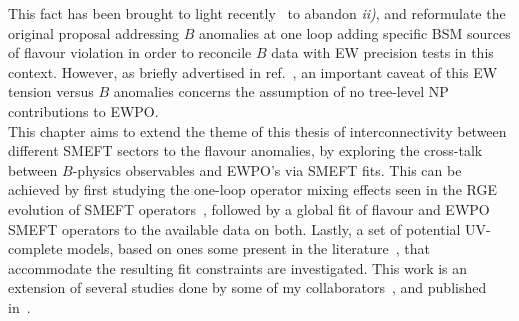 This fact has been brought to light recently~\cite{Coy:2019rfr} to abandon \textit{ii)}, and reformulate the original proposal addressing $B$ anomalies at one loop adding specific {BSM sources of flavour violation in order to reconcile $B$ data with EW precision tests in this context.} However, as briefly advertised in ref.~\cite{Ciuchini:2019usw}, an important caveat of this EW tension versus $B$ anomalies concerns the assumption of no tree-level NP contributions to EWPO. \\
This chapter aims to extend the theme of this thesis of interconnectivity between different SMEFT sectors to the flavour anomalies, by exploring the cross-talk between $B$-physics observables and EWPO's via SMEFT fits. This can be achieved by first studying the one-loop operator mixing effects seen in the RGE evolution of SMEFT operators~\cite{Jenkins:2013zja,Jenkins:2013wua}, followed by a global fit of flavour and EWPO SMEFT operators to the available data on both. Lastly, a set of potential UV-complete models, based on ones some present in the literature~\cite{Kamenik:2017tnu,Fox:2018ldq,Celis:2017doq},  that accommodate the resulting fit constraints are investigated. This work is an extension of several studies done by some of my collaborators~\cite{Ciuchini:2015qxb,Ciuchini:2016weo,Ciuchini:2017mik,Ciuchini:2017gva,Ciuchini:2018xll,Ciuchini:2018anp,Ciuchini:2019usw}, and published in~\cite{Alasfar:2020mne}. 


